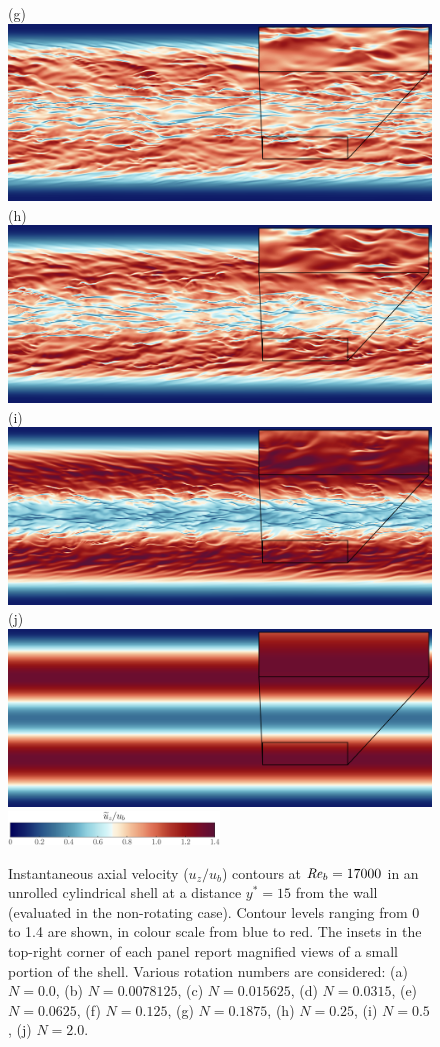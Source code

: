 \documentclass[lineno]{jfm}
\begin{document}
\begin{figure}
                (g) \includegraphics[width=6.cm]{Figures/unrolled_rotz0_roty0.1875_u.png} \\ 
		(h) \includegraphics[width=6.cm]{Figures/unrolled_rotz0_roty0.25_u.png} 
		(i) \includegraphics[width=6.cm]{Figures/unrolled_rotz0_roty0.5_u.png} \\
                (j) \includegraphics[width=6.cm]{Figures/unrolled_rotz0_roty1.0_u.png} 
		\\ \includegraphics[width=0.5\textwidth]{Figures/uz_cmap.eps}
		\caption{
			Instantaneous axial velocity ($u_z/u_b$) contours at $\mbox{\textit{Re}}_b = 17000$
			in an unrolled cylindrical shell at a distance
			$y^*=15$ from the wall (evaluated in the non-rotating case).
			Contour levels ranging from 0 to 1.4 are shown,
			in colour scale from blue to red. 
			The insets in the top-right corner of each panel report magnified views of a small portion of the shell.
			Various rotation numbers are considered:
                        (a) $N = 0.0$,
                        (b) $N = 0.0078125$,
                        (c) $N = 0.015625$,
                        (d) $N = 0.0315$,
                        (e) $N = 0.0625$,
                        (f) $N = 0.125$,
                        (g) $N = 0.1875$,
                        (h) $N = 0.25$,
                        (i) $N = 0.5$,
                        (j) $N = 2.0$.
		}
			\label{fig:utz_500} 
	\end{figure}
	 
\end{document}
